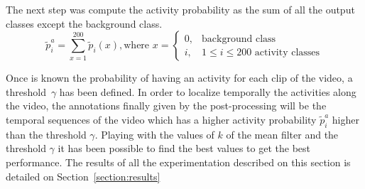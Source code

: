 The next step was compute the activity probability as the sum of all the output classes except the background class.
\begin{equation}
	\tilde{p}^a_i = \sum_{x=1}^{200}\tilde{p}_i(x), \text{where } x = \begin{cases}
        0, & \text{background class} \\
        i, & 1 \leq i \leq 200 \text{ activity classes}
    \end{cases}
\end{equation}

Once is known the probability of having an activity for each clip of the video, a threshold~$\gamma$ has been defined. In order to localize temporally the activities along the video, the annotations finally given by the post-processing will be the temporal sequences of the video which has a higher activity probability $\tilde{p}^a_i$ higher than the threshold $\gamma$. Playing with the values of $k$ of the mean filter and the threshold $\gamma$ it has been possible to find the best values to get the best performance. The results of all the experimentation described on this section is detailed on Section~\ref{section:results}

